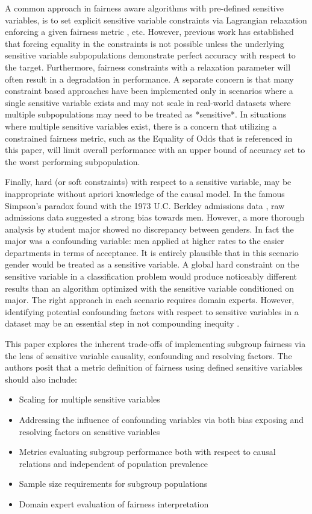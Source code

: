 A common approach in fairness aware algorithms with pre-defined sensitive variables, is to set explicit sensitive variable constraints via Lagrangian relaxation enforcing a given fairness metric \cite{Menon2018TheCO}, \cite{Liu2018} etc.  However, previous work \cite{Menon2018TheCO} has established that forcing equality in the constraints is not possible unless the underlying sensitive variable subpopulations demonstrate perfect accuracy with respect to the target.  Furthermore, fairness constraints with a relaxation parameter will often result in a degradation in performance.
A separate concern is that many constraint based approaches have been implemented only in scenarios where a single sensitive variable exists and may not scale in real-world datasets where multiple subpopulations may need to be treated as *sensitive*.  In situations where multiple sensitive variables exist, there is a concern that utilizing a constrained fairness metric, such as the Equality of Odds that is referenced in this paper, will limit overall performance with an upper bound of accuracy set to the worst performing subpopulation.  
\par
Finally, hard (or soft constraints) with respect to a sensitive variable, may be inappropriate without apriori knowledge of the causal model.  In the famous Simpson's paradox found with the 1973 U.C. Berkley admissions data \cite{BerkeleyBias}, raw admissions data suggested a strong bias towards men.  However, a more thorough analysis by student major showed no discrepancy between genders. In fact the major was a confounding variable: men applied at higher rates to the easier departments in terms of acceptance. It is entirely plausible that in this scenario gender would be treated as a sensitive variable.  A global hard constraint on the sensitive variable in a classification problem would  produce noticeably different results than an algorithm optimized with the sensitive variable conditioned on major. The right approach in each scenario requires domain experts.  However, identifying potential confounding factors with respect to sensitive variables in a dataset may be an essential step in not compounding inequity \cite{Chiappa2018}. 

This paper explores the inherent trade-offs of implementing subgroup fairness via the lens of sensitive variable causality, confounding and resolving factors.  The authors posit that a metric definition of fairness using defined sensitive variables should also include:  

\begin{itemize}
\item Scaling for multiple sensitive variables
\item Addressing the influence of confounding variables via both bias exposing and resolving factors on sensitive variables
\item Metrics evaluating subgroup performance both with respect to causal relations and independent of population prevalence
\item Sample size requirements for subgroup populations 
\item Domain expert evaluation of fairness interpretation
\end{itemize}


